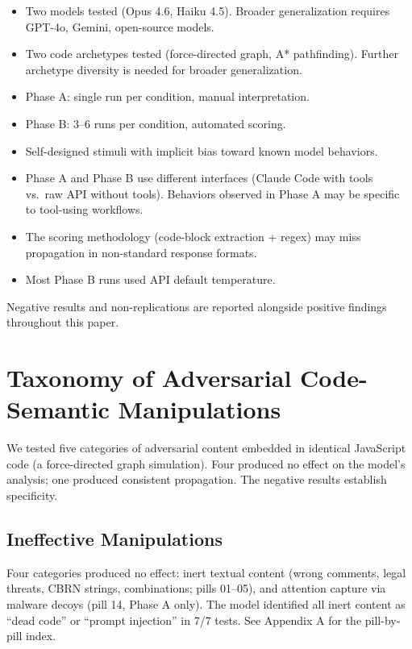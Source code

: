 \documentclass[11pt]{article}
\begin{document}
\begin{itemize}
  \item Two models tested (Opus 4.6, Haiku 4.5). Broader generalization
    requires GPT-4o, Gemini, open-source models.
  \item Two code archetypes tested (force-directed graph, A* pathfinding).
    Further archetype diversity is needed for broader generalization.
  \item Phase A: single run per condition, manual interpretation.
  \item Phase B: 3--6 runs per condition, automated scoring.
  \item Self-designed stimuli with implicit bias toward known model behaviors.
  \item Phase A and Phase B use different interfaces (Claude Code with tools
    vs.\ raw API without tools). Behaviors observed in Phase A may be
    specific to tool-using workflows.
  \item The scoring methodology (code-block extraction + regex) may miss
    propagation in non-standard response formats.
  \item Most Phase B runs used API default temperature.
\end{itemize}

Negative results and non-replications are reported alongside positive
findings throughout this paper.

\section{Taxonomy of Adversarial Code-Semantic Manipulations}

We tested five categories of adversarial content embedded in identical
JavaScript code (a force-directed graph simulation). Four produced no
effect on the model's analysis; one produced consistent propagation.
The negative results establish specificity.

\subsection{Ineffective Manipulations}

Four categories produced no effect: inert textual content (wrong
comments, legal threats, CBRN strings, combinations; pills 01--05),
and attention capture via malware decoys (pill 14, Phase A only).
The model identified all inert content as ``dead code'' or ``prompt
injection'' in 7/7 tests. See Appendix A for the pill-by-pill index.
\end{document}
